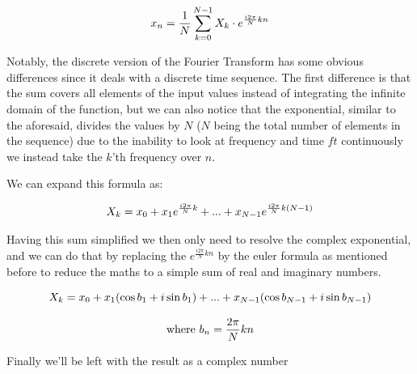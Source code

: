 \documentclass[
  oneside,
  11pt, a4paper,
  footinclude=true,
  headinclude=true,
  cleardoublepage=empty
]{scrbook}
\newcommand{\eqname}[1]{\tag*{#1}}%
\begin{document}
\begin{equation} \label{eq:inverse-discrete-fourier-transform}
    x_{n} = \frac{1}{N} \sum_{k=0}^{N-1}X_{k} \cdot e^{\frac{i 2 \pi}{N}kn} \\ %
\end{equation}

Notably, the discrete version of the Fourier Transform has some obvious differences since it deals with a discrete time sequence. The first difference is that the sum covers all elements of the input values instead of integrating the infinite domain of the function, but we can also notice that the exponential, similar to the aforesaid, divides the values by \(N\) (\(N\) being the total number of elements in the sequence) due to the inability to look at frequency and time \(ft\) continuously we instead take the \(k\)'th frequency over \(n\).

We can expand this formula as:

\begin{equation*}
    X_{k} = x_{0} + x_{1}e^{\frac{i 2 \pi}{N}k} + ... + x_{N-1}e^{\frac{i 2 \pi}{N}k(N-1)} \\
\end{equation*}

Having this sum simplified we then only need to resolve the complex exponential, and we can do that by replacing the \(e^{\frac{i 2 \pi}{N}kn}\) by the euler formula as mentioned before to reduce the maths to a simple sum of real and imaginary numbers.

\begin{equation} \label{dft_reduction}
    X_{k} = x_{0} + x_{1} (\cos{b_{1}} + i\sin{b_{1}}) + ... + x_{N-1} (\cos{b_{N-1}} + i\sin{b_{N-1}}) \\
\end{equation}

\begin{equation*}
    \text{where } \\ b_{n} = \frac{ 2 \pi}{N}kn \\
\end{equation*}


Finally we'll be left with the result as a complex number
\end{document}
